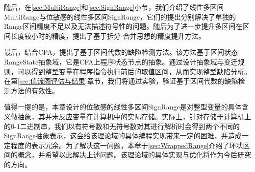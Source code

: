 随后，在\ref{sec:MultiRange}和\ref{sec:SignRange}小节，我们介绍了线性多区间MultiRange与位敏感的线性多区间SignRange，它们的提出分别解决了单独的Range区间精度不足以及无法描述符号性的问题。随后为了进一步提升多区间在区间长度较小时的精度，提出了基于拆分-合并思想的精度提升方法。

最后，结合CPA，提出了基于区间代数的缺陷检测方法。该方法基于区间状态RangeState抽象域，它是CFA上程序状态节点的抽象。通过设计抽象域与变迁规则，可以得到整型变量在程序指令执行前后的取值区间，从而实现整型缺陷分析。在第\ref{sec:值流图评估与结果}章节，我们将通过实验，验证基于区间代数的缺陷检测方法的有效性。

值得一提的是，本章设计的位敏感的线性多区间SignRange是对整型变量的具体含义做抽象，其并未反应变量在计算机中的实际存储。实际上，针对存储于计算机上的0-1二进制串，我们以有符号数和无符号数对其进行解析时会得到两个不同的SignRange抽象表示，这会给该理论域的具体编程实现带来一定的困难，并造成一定程度的表示冗余。为了解决这一问题，本章于\ref{sec:WrappedRange}介绍了环状区间的概念，并希望以此解决上述问题。该理论域的具体实现与优化将作为今后研究的方向。




















































